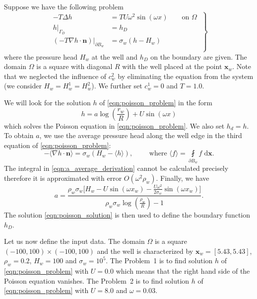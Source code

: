 \documentclass{elsarticle}
\newcommand{\prob}[1]{Problem~{#1}}
\def\vc#1{\mathbf{\boldsymbol{#1}}}     %
\newcommand{\dd}{\; \mathrm{d}}
\newcommand{\bx}{\vc{x}}
\begin{document}
Suppose we have the following problem
\begin{equation} \label{eqn:poisson_problem}
\left.\begin{aligned}
    -T \Delta h &= TU\omega^2\sin(\omega x) \qquad \textrm{on } \Omega \\
    h|_{\Gamma_D} &= h_D\\
    \left(-T\nabla h\cdot\vc{n}\right)|_{\partial B_w} &= \sigma_w\left(h - H_w\right) \\
    \end{aligned}
    \;\right\}
\end{equation}
where the pressure head $H_w$ at the well and $h_D$ on the boundary are given. 
The domain $\Omega$ is a square with diagonal $R$ with the well placed at the point $\vc{x}_w$.
Note that we neglected the influence of $c^2_w$ by eliminating the equation from the system (we consider 
$H_w = H^1_w = H^2_w$). We further set $c^1_w=0$ and $T=1.0$. 

We will look for the solution $h$ of \eqref{eqn:poisson_problem} in the form
\begin{equation} \label{eqn:poisson_solution}
  h=a\log\left(\frac{r_w}{R}\right)+U\sin(\omega x)
\end{equation}
which solves the Poisson equation in \eqref{eqn:poisson_problem}. We also set $h_d=h$.
To obtain $a$, we use the average pressure head along the well edge in the third equation 
of \eqref{eqn:poisson_problem}:
\begin{equation} \label{eqn:a_average_derivation}
     -\langle\nabla h \cdot \vc{n}\rangle = \sigma_w\left(H_w - \langle{h}\rangle \right), 
    \qquad \textrm{ where } \langle{f}\rangle = \fint \limits_{\partial B_w} f  \dd\bx.
\end{equation}
The integral in \eqref{eqn:a_average_derivation} cannot be calculated precisely therefore it is approximated with error 
$O(\omega^2 \rho_w)$. Finally, we have
\begin{equation} \label{eqn:a_constant}
    a=\frac{\rho_w \sigma_w \big[H_w - U\sin(\omega x_w) - \frac{U\omega^2}{2\sigma_w}\sin(\omega x_w)\big]}
           {\rho_w \sigma_w \log\left(\frac{\rho_w}{R}\right) - 1}.
\end{equation}
The solution \eqref{eqn:poisson_solution} is then used to define the boundary function $h_D$.

Let us now define the input data. The domain $\Omega$ is a square $(-100,100)\times(-100,100)$ and the well is characterized by 
$\vc{x}_w=[5.43,5.43]$,  $\rho_w=0.2$, $H_w=100$ and $\sigma_w=10^5$. The \prob{1} is to find solution $h$ of
\eqref{eqn:poisson_problem} with $U=0.0$ which means that the right hand side of the Poisson equation vanishes.
The \prob{2} is to find solution $h$ of \eqref{eqn:poisson_problem} with $U=8.0$ and $\omega=0.03$.
\end{document}
